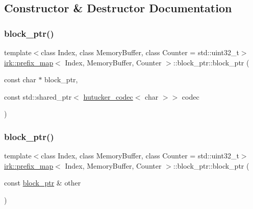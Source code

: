 \subsection{Constructor \& Destructor Documentation}
\mbox{\label{classirk_1_1prefix__map_1_1block__ptr_abd70038e4a11fca54427b6b439cc4263}} 
\subsubsection{\texorpdfstring{block\+\_\+ptr()}{block\_ptr()}\hspace{0.1cm}{\footnotesize\ttfamily [1/2]}}
{\footnotesize\ttfamily template$<$class Index, class Memory\+Buffer, class Counter = std\+::uint32\+\_\+t$>$ \\
\mbox{\hyperlink{classirk_1_1prefix__map}{irk\+::prefix\+\_\+map}}$<$ Index, Memory\+Buffer, Counter $>$\+::block\+\_\+ptr\+::block\+\_\+ptr (\begin{DoxyParamCaption}\item[{const char $\ast$}]{block\+\_\+ptr,  }\item[{const std\+::shared\+\_\+ptr$<$ \mbox{\hyperlink{classirk_1_1hutucker__codec}{hutucker\+\_\+codec}}$<$ char $>$$>$}]{codec }\end{DoxyParamCaption})\hspace{0.3cm}{\ttfamily [inline]}}

\mbox{\label{classirk_1_1prefix__map_1_1block__ptr_a4e7e5d0950f932fe13cb44701aa43d40}} 
\subsubsection{\texorpdfstring{block\+\_\+ptr()}{block\_ptr()}\hspace{0.1cm}{\footnotesize\ttfamily [2/2]}}
{\footnotesize\ttfamily template$<$class Index, class Memory\+Buffer, class Counter = std\+::uint32\+\_\+t$>$ \\
\mbox{\hyperlink{classirk_1_1prefix__map}{irk\+::prefix\+\_\+map}}$<$ Index, Memory\+Buffer, Counter $>$\+::block\+\_\+ptr\+::block\+\_\+ptr (\begin{DoxyParamCaption}\item[{const \mbox{\hyperlink{classirk_1_1prefix__map_1_1block__ptr}{block\+\_\+ptr}} \&}]{other }\end{DoxyParamCaption})\hspace{0.3cm}{\ttfamily [default]}}



